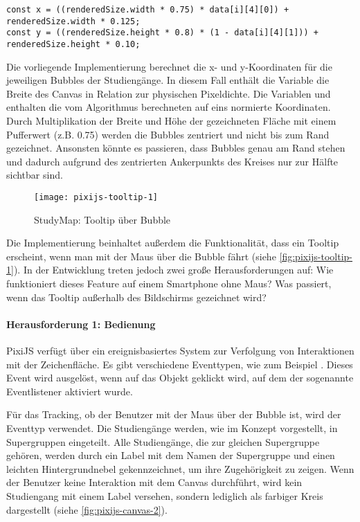 \begin{lstlisting}[style=Python]
const x = ((renderedSize.width * 0.75) * data[i][4][0]) + renderedSize.width * 0.125;
const y = ((renderedSize.height * 0.8) * (1 - data[i][4][1])) + renderedSize.height * 0.10;
\end{lstlisting}

Die vorliegende Implementierung berechnet die x- und y-Koordinaten für die jeweiligen Bubbles der Studiengänge. In diesem Fall enthält die Variable  die Breite des Canvas in Relation zur physischen Pixeldichte. Die Variablen  und  enthalten die vom Algorithmus berechneten auf eins normierte Koordinaten. Durch Multiplikation der Breite und Höhe der gezeichneten Fläche mit einem Pufferwert (z.B. 0.75) werden die Bubbles zentriert und nicht bis zum Rand gezeichnet. Ansonsten könnte es passieren, dass Bubbles genau am Rand stehen und dadurch aufgrund des zentrierten Ankerpunkts des Kreises nur zur Hälfte sichtbar sind.

\begin{figure}[H]
    \centering
    \texttt{[image: pixijs-tooltip-1]}
    \caption{StudyMap: Tooltip über Bubble}
    \label{fig:pixijs-tooltip-1}
\end{figure}

Die Implementierung beinhaltet außerdem die Funktionalität, dass ein Tooltip erscheint, wenn man mit der Maus über die Bubble fährt (siehe \autoref{fig:pixijs-tooltip-1}). In der Entwicklung treten jedoch zwei große Herausforderungen auf: Wie funktioniert dieses Feature auf einem Smartphone ohne Maus? Was passiert, wenn das Tooltip außerhalb des Bildschirms gezeichnet wird?

\paragraph*{Herausforderung 1: Bedienung}
PixiJS verfügt über ein ereignisbasiertes System zur Verfolgung von Interaktionen mit der Zeichenfläche. Es gibt verschiedene Eventtypen, wie zum Beispiel . Dieses Event wird ausgelöst, wenn auf das Objekt geklickt wird, auf dem der sogenannte Eventlistener aktiviert wurde. \parencite{pixijs_interaction_2024}

Für das Tracking, ob der Benutzer mit der Maus über der Bubble ist, wird der Eventtyp  verwendet. Die Studiengänge werden, wie im Konzept vorgestellt, in Supergruppen eingeteilt. Alle Studiengänge, die zur gleichen Supergruppe gehören, werden durch ein Label mit dem Namen der Supergruppe und einen leichten Hintergrundnebel gekennzeichnet, um ihre Zugehörigkeit zu zeigen. Wenn der Benutzer keine Interaktion mit dem Canvas durchführt, wird kein Studiengang mit einem Label versehen, sondern lediglich als farbiger Kreis dargestellt (siehe \autoref{fig:pixijs-canvas-2}).

